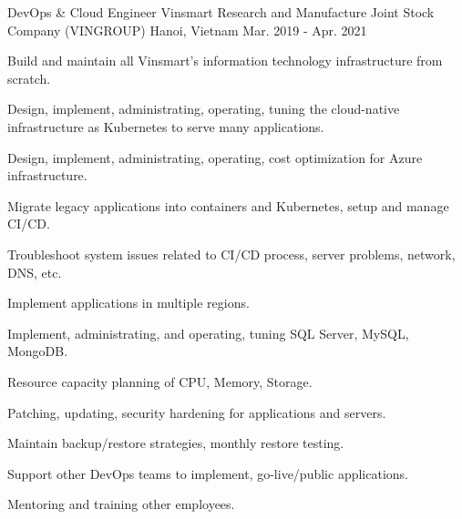 \begin{cventries}
  \cventry
    {DevOps \& Cloud Engineer} %
    {Vinsmart Research and Manufacture Joint Stock Company (VINGROUP)} %
    {Hanoi, Vietnam} %
    {Mar. 2019 - Apr. 2021} %
    {
      \begin{cvitems} %
        \item {Build and maintain all Vinsmart's information technology infrastructure from scratch.}
        \item {Design, implement, administrating, operating, tuning the cloud-native infrastructure as Kubernetes to serve many applications.}
        \item {Design, implement, administrating, operating, cost optimization for Azure infrastructure.}
        \item {Migrate legacy applications into containers and Kubernetes, setup and manage CI/CD.}
        \item {Troubleshoot system issues related to CI/CD process, server problems, network, DNS, etc.}
        \item {Implement applications in multiple regions.}
        \item {Implement, administrating, and operating, tuning SQL Server, MySQL, MongoDB.}
        \item {Resource capacity planning of CPU, Memory, Storage.}
        \item {Patching, updating, security hardening for applications and servers.}
        \item {Maintain backup/restore strategies, monthly restore testing.}
        \item {Support other DevOps teams to implement, go-live/public applications.}
        \item {Mentoring and training other employees.}
      \end{cvitems}
    }


\end{cventries}
